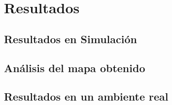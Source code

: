 \chapter{Resultados}


\section{Resultados en Simulaci\'on}


\section{An\'alisis del mapa obtenido}



\section{Resultados en un ambiente real}